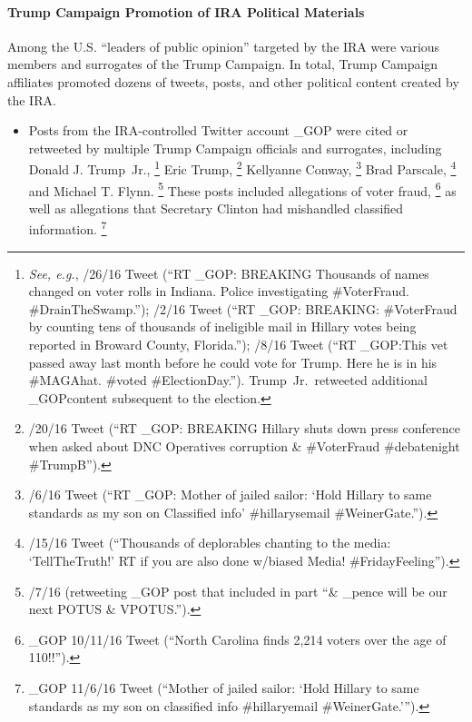 \paragraph{Trump Campaign Promotion of IRA Political Materials}

Among the U.S. ``leaders of public opinion'' targeted by the IRA were various members and surrogates of the Trump Campaign.
In total, Trump Campaign affiliates promoted dozens of tweets, posts, and other political content created by the IRA\null.

\begin{itemize}
    \item Posts from the IRA-controlled Twitter account \@TEN\_GOP were cited or retweeted by multiple Trump Campaign officials and surrogates, including Donald J. Trump~Jr.,%
	    \footnote{\textit{See, e.g.}, /26/16 Tweet (``RT \@TEN\_GOP: BREAKING Thousands of names changed on voter rolls in Indiana.
    Police investigating \#VoterFraud. \#DrainTheSwamp.'');
    /2/16 Tweet (``RT \@TEN\_GOP: BREAKING: \#VoterFraud by counting tens of thousands of ineligible mail in Hillary votes being reported in Broward County, Florida.'');
    /8/16 Tweet (``RT \@TEN\_GOP:This vet passed away last month before he could vote for Trump.
    Here he is in his \#MAGAhat.
    \#voted \#ElectionDay.''). Trump~Jr.\ retweeted additional \@TEN\_GOPcontent subsequent to the election.}
    Eric Trump,%
    \footnote{/20/16 Tweet (``RT \@TEN\_GOP: BREAKING Hillary shuts down press conference when asked about DNC Operatives corruption \& \#VoterFraud \#debatenight \#TrumpB'').}
    Kellyanne Conway,%
    \footnote{/6/16 Tweet (``RT \@TEN\_GOP: Mother of jailed sailor: `Hold Hillary to same standards as my son on Classified info' \#hillarysemail \#WeinerGate.'').}
    Brad Parscale,%
    \footnote{/15/16 Tweet (``Thousands of deplorables chanting to the media: `TellTheTruth!' RT if you are also done w/biased Media! \#FridayFeeling'').}
    and Michael T. Flynn.%
    \footnote{/7/16 (retweeting \@TEN\_GOP post that included in part ``\@realDonaldTrump \& \@mike\_pence will be our next POTUS \& VPOTUS.'').}
    These posts included allegations of voter fraud,%
    \footnote{\@TEN\_GOP 10/11/16 Tweet (``North Carolina finds 2,214 voters over the age of 110!!'').}
    as well as allegations that Secretary Clinton had mishandled classified information.%
		\footnote{\@TEN\_GOP 11/6/16 Tweet (``Mother of jailed sailor: `Hold Hillary to same standards as my son on classified info \#hillaryemail \#WeinerGate.'\thinspace'').}

\end{itemize}
